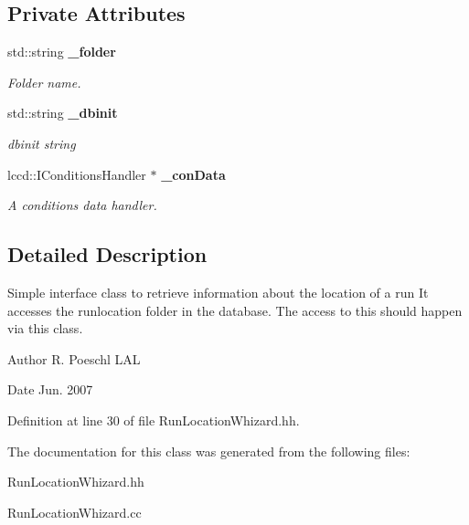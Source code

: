 \subsection*{Private Attributes}
\begin{DoxyCompactItemize}
\item 
std::string {\bf \_\-folder}\label{classCALICE_1_1RunLocationWhizard_a1c7eeff9f0411c3a885ecee2d7bfbfc8}

\begin{DoxyCompactList}\small\item\em Folder name. \item\end{DoxyCompactList}\item 
std::string {\bf \_\-dbinit}\label{classCALICE_1_1RunLocationWhizard_a61b7efac157c2370d83ee627efbc3563}

\begin{DoxyCompactList}\small\item\em dbinit string \item\end{DoxyCompactList}\item 
lccd::IConditionsHandler $\ast$ {\bf \_\-conData}\label{classCALICE_1_1RunLocationWhizard_a06e4848ddb058006abe9343dc9c4127c}

\begin{DoxyCompactList}\small\item\em A conditions data handler. \item\end{DoxyCompactList}\end{DoxyCompactItemize}


\subsection{Detailed Description}
Simple interface class to retrieve information about the location of a run It accesses the runlocation folder in the database. The access to this should happen via this class. 

\begin{DoxyAuthor}{Author}
R. Poeschl LAL 
\end{DoxyAuthor}
\begin{DoxyDate}{Date}
Jun. 2007 
\end{DoxyDate}


Definition at line 30 of file RunLocationWhizard.hh.

The documentation for this class was generated from the following files:\begin{DoxyCompactItemize}
\item 
RunLocationWhizard.hh\item 
RunLocationWhizard.cc\end{DoxyCompactItemize}
